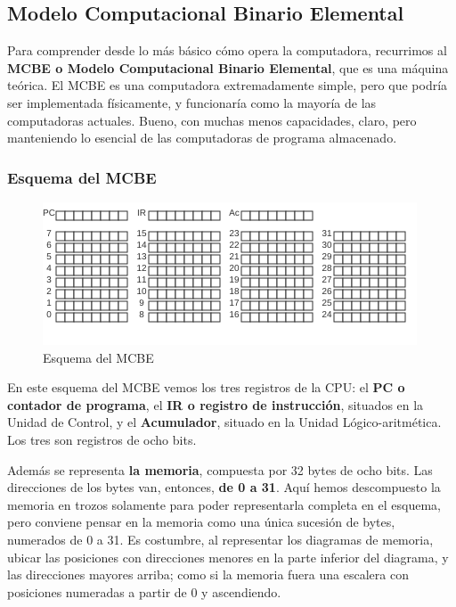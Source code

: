 \documentclass[spanish,a4paper,]{article}
\begin{document}
\hypertarget{modelo-computacional-binario-elemental}{%
\subsection{Modelo Computacional Binario
Elemental}\label{modelo-computacional-binario-elemental}}

Para comprender desde lo más básico cómo opera la computadora,
recurrimos al \textbf{MCBE o Modelo Computacional Binario Elemental},
que es una máquina teórica. El MCBE es una computadora extremadamente
simple, pero que podría ser implementada físicamente, y funcionaría como
la mayoría de las computadoras actuales. Bueno, con muchas menos
capacidades, claro, pero manteniendo lo esencial de las computadoras de
programa almacenado.

\hypertarget{esquema-del-mcbe}{%
\subsubsection{Esquema del MCBE}\label{esquema-del-mcbe}}

\begin{figure}
\centering
\includegraphics{img/MCBE.png}
\caption{Esquema del MCBE}
\end{figure}

En este esquema del MCBE vemos los tres registros de la CPU: el
\textbf{PC o contador de programa}, el \textbf{IR o registro de
instrucción}, situados en la Unidad de Control, y el
\textbf{Acumulador}, situado en la Unidad Lógico-aritmética. Los tres
son registros de ocho bits.

Además se representa \textbf{la memoria}, compuesta por 32 bytes de ocho
bits. Las direcciones de los bytes van, entonces, \textbf{de 0 a 31}.
Aquí hemos descompuesto la memoria en trozos solamente para poder
representarla completa en el esquema, pero conviene pensar en la memoria
como una única sucesión de bytes, numerados de 0 a 31. Es costumbre, al
representar los diagramas de memoria, ubicar las posiciones con
direcciones menores en la parte inferior del diagrama, y las direcciones
mayores arriba; como si la memoria fuera una escalera con posiciones
numeradas a partir de 0 y ascendiendo.
\end{document}
